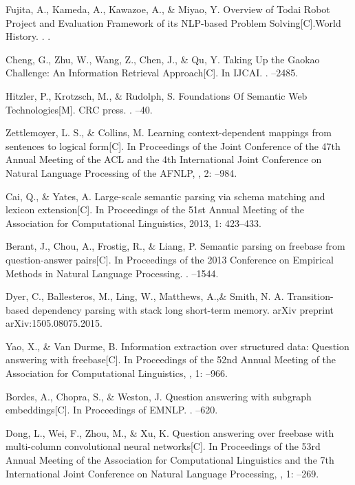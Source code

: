 \begin{thebibliography}{10}

Fujita, A., Kameda, A., Kawazoe, A., \& Miyao, Y.
\newblock Overview of Todai Robot Project and Evaluation Framework of its NLP-based Problem Solving[C].World History.
.
.

Cheng, G., Zhu, W., Wang, Z., Chen, J., \& Qu, Y.
\newblock Taking Up the Gaokao Challenge: An Information Retrieval Approach[C]. 
\newblock In IJCAI.
.
--2485.

Hitzler, P., Krotzsch, M., \& Rudolph, S. 
\newblock Foundations Of Semantic Web Technologies[M].
\newblock CRC press.
.
--40.

Zettlemoyer, L. S., \& Collins, M.
\newblock Learning
context-dependent mappings from sentences to logical form[C].
\newblock In Proceedings of the Joint Conference of the 47th Annual
Meeting of the ACL and the 4th International Joint Conference
on Natural Language Processing of the AFNLP,
, 2:
--984.

Cai, Q., \& Yates, A.
\newblock Large-scale semantic parsing via schema matching and lexicon extension[C]. In Proceedings of the 51st Annual Meeting of the Association for Computational Linguistics, 2013, 1: 423--433.


Berant, J., Chou, A., Frostig, R., \& Liang, P.
\newblock Semantic parsing on freebase from question-answer pairs[C]. In Proceedings of the 2013 Conference on Empirical Methods in Natural Language Processing.
.
--1544.

Dyer, C., Ballesteros, M., Ling, W., Matthews, A.,\& Smith, N. A.
\newblock Transition-based dependency parsing with stack long short-term memory.
\newblock arXiv preprint arXiv:1505.08075.2015.

Yao, X., \& Van Durme, B.
\newblock Information extraction over
structured data: Question answering with freebase[C].
In Proceedings of the 52nd Annual Meeting of the Association
for Computational Linguistics, 
, 1:
--966.

Bordes, A., Chopra, S., \& Weston, J.
\newblock Question answering with subgraph embeddings[C]. In Proceedings of
EMNLP.
.
--620.

Dong, L., Wei, F., Zhou, M., \& Xu, K.
\newblock Question answering over freebase with multi-column convolutional neural networks[C].
\newblock In Proceedings of the 53rd Annual Meeting of the Association for Computational Linguistics and the 7th International Joint Conference on Natural Language Processing, 
, 1:
--269.


\end{thebibliography}
